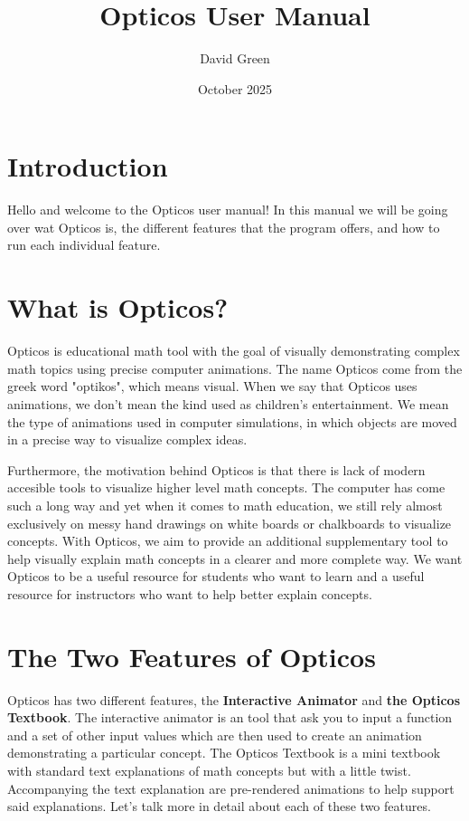 \documentclass{article}
\title{Opticos User Manual}
\author{David Green}
\date{October 2025}
\begin{document}
\maketitle

\section*{Introduction}
Hello and welcome to the Opticos user manual! In this manual we will be going over wat Opticos is, the different features that the program offers, and how to run each individual feature.

\section*{What is Opticos?}
Opticos is educational math tool with the goal of visually demonstrating complex math topics using precise computer animations. The name Opticos come from the greek word "optikos", which means visual. When we say that Opticos uses animations, we don't mean the kind used as children's entertainment. We mean the type of animations used in computer simulations, in which objects are moved in a precise way to visualize complex ideas.
\bigskip

Furthermore, the motivation behind Opticos is that there is lack of modern accesible tools to visualize higher level math concepts. The computer has come such a long way and yet when it comes to math education, we still rely almost exclusively on messy hand drawings on white boards or chalkboards to visualize concepts. With Opticos, we aim to provide an additional supplementary tool to help visually explain math concepts in a clearer and more complete way. We want Opticos to be a useful resource for students who want to learn and a useful resource for instructors who want to help better explain concepts.

\section*{The Two Features of Opticos}
Opticos has two different features, the \textbf{Interactive Animator} and \textbf{the Opticos Textbook}. The interactive animator is an tool that ask you to input a function and a set of other input values which are then used to create an animation demonstrating a particular concept. The Opticos Textbook is a mini textbook with standard text explanations of math concepts but with a little twist. Accompanying the text explanation are pre-rendered animations to help support said explanations. Let's talk more in detail about each of these two features.
\end{document}
